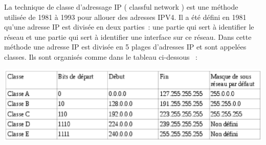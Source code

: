 \documentclass[twoside,openright,a4paper,11pt,french]{article}
\begin{document}
\pagestyle{plain}




\parskip=0pt
\tableofcontents





La technique de classe d'adressage IP ( classful network ) est une méthode utilisée de 1981 à 1993 pour allouer des adresses IPV4. Il a été défini en 1981 qu'une adresse IP est divisée en deux parties : une partie qui sert à identifier le réseau et une partie qui sert à identifier une interface sur ce réseau.
Dans cette méthode une adresse IP est divisée en 5 plages d'adresses IP et sont appelées classes. Ils sont organisés comme dans le tableau ci-dessous  :

\includegraphics{./pics/tableau.eps}
\end{document}
